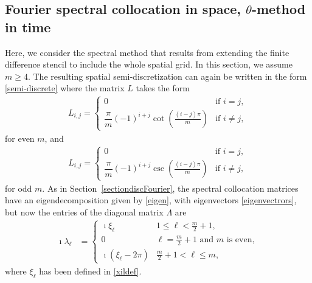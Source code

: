 \documentclass[a4paper]{article}
\begin{document}
\subsection{Fourier spectral collocation in space, \texorpdfstring{$\theta$}{}-method in time}\label{spectrcoll}
Here, we consider the spectral method that results from extending the
finite difference stencil to include the whole spatial grid.  In this section, we assume $m\ge 4$. The resulting spatial 
semi-discretization can again be written in the form \eqref{semi-discrete}
where the matrix $L$ takes the form \cite{trefethen,peyret}
\begin{align*}
	L_{i,j} = \begin{cases}
						0 & \text{if } i = j, \\[10pt]
						\dfrac{\pi}{m}(-1)^{i+j}\cot{\!\left(\frac{(i-j)\pi}{m}\right)} & \text{if } i \neq j,
					\end{cases}
\end{align*}
for even $m$, and
\begin{align*}
	L_{i,j} = \begin{cases}
						0 & \text{if } i = j, \\[10pt]
						\dfrac{\pi}{m}(-1)^{i+j}\csc{\!\left(\frac{(i-j)\pi}{m}\right)} & \text{if } i \neq j,
					\end{cases}
\end{align*}
for odd $m$.
As in Section~\ref{sectiondiscFourier}, the spectral collocation matrices have an eigendecomposition given by
\eqref{eigen}, with eigenvectors \eqref{eigenvectrors}, but now the entries of the diagonal matrix $\Lambda$ are
\begin{align}\label{lambdaSCdef}
    \imath\lambda_\ell & =
    \begin{cases}
        \imath\xi_\ell & 1 \le \ell < \frac{m}{2}+1, \\
        0 & \ell = \frac{m}{2}+1 \text{ and } m \text{ is even}, \\ %
        \imath(\xi_\ell - 2\pi) & \frac{m}{2}+1 < \ell \le m,
    \end{cases}
\end{align}
where $\xi_\ell$ has been defined in \eqref{xildef}.
\end{document}
